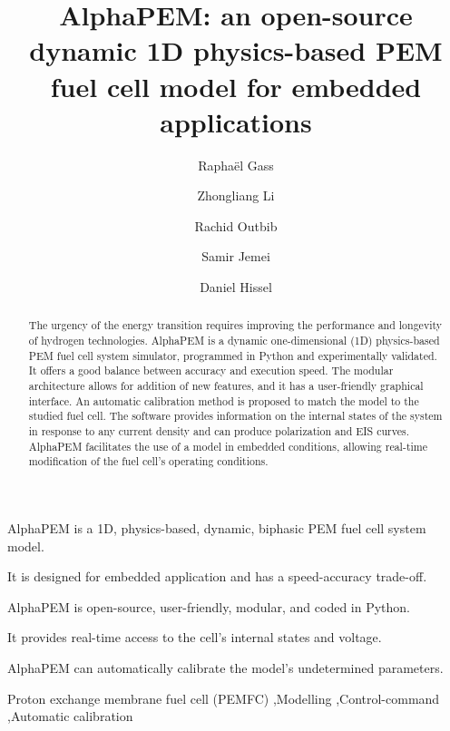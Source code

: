 \documentclass[postprint,3p,times]{elsarticle}
\begin{document}
\renewcommand{\labelenumii}{\arabic{enumi}.\arabic{enumii}}

\begin{frontmatter}

\title{AlphaPEM: an open-source dynamic 1D physics-based PEM fuel cell model for embedded applications}

\author[FEMTO,LIS]{Raphaël Gass }

\author[FEMTO]{Zhongliang Li}
\author[LIS]{Rachid Outbib}
\author[FEMTO]{Samir Jemei}
\author[FEMTO,Institut]{Daniel Hissel}

\address[FEMTO]{Université de Franche-Comté, UTBM, CNRS, institut FEMTO-ST, FCLAB, Belfort, France}
\address[LIS]{Aix Marseille Univ, CNRS, LIS, Marseille, France}
\address[Institut]{Institut Universitaire de France, France}

\begin{highlights}
	\item AlphaPEM is a 1D, physics-based, dynamic, biphasic PEM fuel cell system model.
	\item It is designed for embedded application and has a speed-accuracy trade-off.
	\item AlphaPEM is open-source, user-friendly, modular, and coded in Python.
	\item It provides real-time access to the cell's internal states and voltage.
	\item AlphaPEM can automatically calibrate the model's undetermined parameters.
\end{highlights}

\begin{abstract}
	The urgency of the energy transition requires improving the performance and longevity of hydrogen technologies. AlphaPEM is a dynamic one-dimensional (1D) physics-based PEM fuel cell system simulator, programmed in Python and experimentally validated. It offers a good balance between accuracy and execution speed. The modular architecture allows for addition of new features, and it has a user-friendly graphical interface. An automatic calibration method is proposed to match the model to the studied fuel cell. The software provides information on the internal states of the system in response to any current density and can produce polarization and EIS curves. AlphaPEM facilitates the use of a model in embedded conditions, allowing real-time modification of the fuel cell's operating conditions.
\end{abstract}

\begin{keyword}
	Proton exchange membrane fuel cell (PEMFC) \sep Modelling \sep Control-command \sep Automatic calibration
\end{keyword}

\end{frontmatter}
\end{document}
